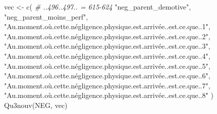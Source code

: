 \documentclass[
]{article}
\newenvironment{Shaded}{\begin{snugshade}}{\end{snugshade}}
\newcommand{\CommentTok}[1]{\textcolor[rgb]{0.56,0.35,0.01}{\textit{#1}}}
\newcommand{\FunctionTok}[1]{\textcolor[rgb]{0.00,0.00,0.00}{#1}}
\newcommand{\NormalTok}[1]{#1}
\newcommand{\OtherTok}[1]{\textcolor[rgb]{0.56,0.35,0.01}{#1}}
\newcommand{\StringTok}[1]{\textcolor[rgb]{0.31,0.60,0.02}{#1}}
\begin{document}
\begin{Shaded}
\begin{Highlighting}[]
\NormalTok{vec }\OtherTok{\textless{}{-}} \FunctionTok{c}\NormalTok{(  }\CommentTok{\# ..496..497.. = 615{-}624}
  \StringTok{"neg\_parent\_demotive"}\NormalTok{,}
  \StringTok{"neg\_parent\_moins\_perf"}\NormalTok{,}
  \StringTok{"Au.moment.où.cette.négligence.physique.est.arrivée..est.ce.que..1"}\NormalTok{,}
  \StringTok{"Au.moment.où.cette.négligence.physique.est.arrivée..est.ce.que..2"}\NormalTok{,}
  \StringTok{"Au.moment.où.cette.négligence.physique.est.arrivée..est.ce.que..3"}\NormalTok{,}
  \StringTok{"Au.moment.où.cette.négligence.physique.est.arrivée..est.ce.que..4"}\NormalTok{,}
  \StringTok{"Au.moment.où.cette.négligence.physique.est.arrivée..est.ce.que..5"}\NormalTok{,}
  \StringTok{"Au.moment.où.cette.négligence.physique.est.arrivée..est.ce.que..6"}\NormalTok{,}
  \StringTok{"Au.moment.où.cette.négligence.physique.est.arrivée..est.ce.que..7"}\NormalTok{,}
  \StringTok{"Au.moment.où.cette.négligence.physique.est.arrivée..est.ce.que..8"}
\NormalTok{  )}
\FunctionTok{Qu3nouv}\NormalTok{(NEG, vec)}
\end{Highlighting}
\end{Shaded}
\end{document}
